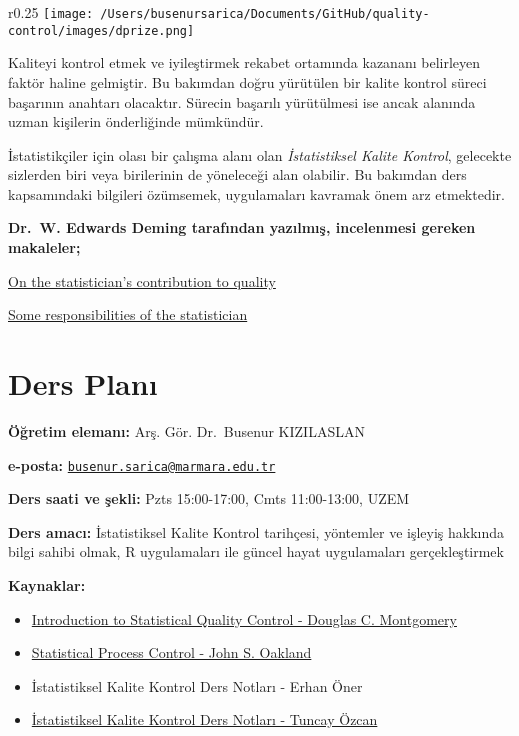 \documentclass[
]{book}
\begin{document}
\begin{wrapfigure}{r}{0.25\textwidth}
    \centering
    \texttt{[image: /Users/busenursarica/Documents/GitHub/quality-control/images/dprize.png]}
\end{wrapfigure}

Kaliteyi kontrol etmek ve iyileştirmek rekabet ortamında kazananı belirleyen faktör haline gelmiştir. Bu bakımdan doğru yürütülen bir kalite kontrol süreci başarının anahtarı olacaktır. Sürecin başarılı yürütülmesi ise ancak alanında uzman kişilerin önderliğinde mümkündür.

İstatistikçiler için olası bir çalışma alanı olan \emph{İstatistiksel Kalite Kontrol}, gelecekte sizlerden biri veya birilerinin de yöneleceği alan olabilir. Bu bakımdan ders kapsamındaki bilgileri özümsemek, uygulamaları kavramak önem arz etmektedir.

\vspace{0.3cm}

\textbf{Dr.~W. Edwards Deming tarafından yazılmış, incelenmesi gereken makaleler;}

\vspace{0.1cm}

\href{https://deming.org/wp-content/uploads/2020/06/On-The-Statisticians-Contribution-to-Quality-1987.pdf}{On the statistician's contribution to quality}

\href{https://deming.org/wp-content/uploads/2020/06/Some-Responsibilities-of-a-Statistician-1964.pdf}{Some responsibilities of the statistician}

\hypertarget{ders-planux131}{%
\chapter{Ders Planı}\label{ders-planux131}}

\textbf{Öğretim elemanı:} Arş. Gör. Dr.~Busenur KIZILASLAN

\textbf{e-posta:} \href{mailto:busenur.sarica@marmara.edu.tr}{\nolinkurl{busenur.sarica@marmara.edu.tr}}

\textbf{Ders saati ve şekli:} Pzts 15:00-17:00, Cmts 11:00-13:00, UZEM

\textbf{Ders amacı:} İstatistiksel Kalite Kontrol tarihçesi, yöntemler ve işleyiş hakkında bilgi sahibi olmak, R uygulamaları ile güncel hayat uygulamaları gerçekleştirmek

\textbf{Kaynaklar:}

\begin{itemize}
\item
  \href{http://endustri.eskisehir.edu.tr/ipoyraz/TKY302/icerik/text\%20book_montgomery_6th\%20edition.pdf}{Introduction to Statistical Quality Control - Douglas C. Montgomery}
\item
  \href{http://www.diliev.com/Home/materiali/KHEA/referati/6812268-Statistical-Process-Control-eBook-VG.pdf}{Statistical Process Control - John S. Oakland}
\item
  İstatistiksel Kalite Kontrol Ders Notları - Erhan Öner
\item
  \href{http://auzefkitap.istanbul.edu.tr/kitap/endustrimuhlt_ue/istatistikselkalitekontrolu.pdf}{İstatistiksel Kalite Kontrol Ders Notları - Tuncay Özcan}
\end{itemize}
\end{document}
